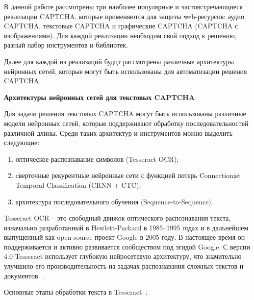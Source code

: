 В данной работе рассмотрены три наиболее популярные и частовстречающиеся 
реализации CAPTCHA, которые применяются для защиты web-ресурсов: аудио CAPTCHA, 
текстовые CAPTCHA и графические CAPTCHA (CAPTCHA с изображениями). Для каждой 
реализации необходим свой подход к решению, разный набор инструментов и библиотек.

Далее для каждой из реализаций будцт рассмотрены различные архитектуры нейронных 
сетей, которые могут быть использованы для автоматизации решения CAPTCHA.

\textbf{Архитектуры нейронных сетей для текстовых CAPTCHA}

Для задачи решения текстовых CAPTCHA могут быть использованы различные модели 
нейронных сетей, которые поддерживают обработку последовательностей различной 
длины. Среди таких архитектур и инструментов можно выделить следующие:

\begin{enumerate}
    \item оптическое распознавание символов (Tesseract OCR);
    \item cверточные рекурентные нейронные сети с функцией потерь Connectionist 
    Temporal Classification (CRNN + CTC);
    \item архитектура последовательного обучения (Sequence-to-Sequence).
\end{enumerate}

Tesseract OCR -- это свободный движок оптического распознавания текста, 
изначально разработанный в Hewlett-Packard в 1985–1995 годах и в дальнейшем 
выпущенный как open-source-проект Google в 2005 году. В настоящее время он 
поддерживается и активно развивается сообществом под эгидой Google. С версии 4.0 
Tesseract использует глубокую нейросетевую архитектуру, что значительно улучшило 
его производительность на задачах распознавания сложных текстов и документов
~\cite{tesseract}.

Основные этапы обработки текста в Tesseract~\cite{tesseractbook}:

